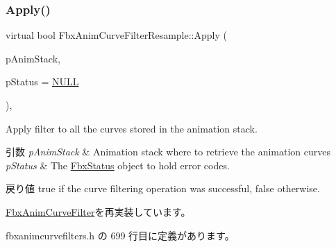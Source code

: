 \subsubsection{\texorpdfstring{Apply()}{Apply()}\hspace{0.1cm}{\footnotesize\ttfamily [1/5]}}
{\footnotesize\ttfamily virtual bool Fbx\+Anim\+Curve\+Filter\+Resample\+::\+Apply (\begin{DoxyParamCaption}\item[{\hyperlink{class_fbx_anim_stack}{Fbx\+Anim\+Stack} $\ast$}]{p\+Anim\+Stack,  }\item[{\hyperlink{class_fbx_status}{Fbx\+Status} $\ast$}]{p\+Status = {\ttfamily \hyperlink{fbxarch_8h_a070d2ce7b6bb7e5c05602aa8c308d0c4}{N\+U\+LL}} }\end{DoxyParamCaption})\hspace{0.3cm}{\ttfamily [inline]}, {\ttfamily [virtual]}}

Apply filter to all the curves stored in the animation stack. 
\begin{DoxyParams}{引数}
{\em p\+Anim\+Stack} & Animation stack where to retrieve the animation curves \\
\hline
{\em p\+Status} & The \hyperlink{class_fbx_status}{Fbx\+Status} object to hold error codes. \\
\hline
\end{DoxyParams}
\begin{DoxyReturn}{戻り値}
{\ttfamily true} if the curve filtering operation was successful, {\ttfamily false} otherwise. 
\end{DoxyReturn}


\hyperlink{class_fbx_anim_curve_filter_aef3900e6180e05661c27ee484ae939c3}{Fbx\+Anim\+Curve\+Filter}を再実装しています。



 fbxanimcurvefilters.\+h の 699 行目に定義があります。

\mbox{\label{class_fbx_anim_curve_filter_resample_a6f22a537869dc295ceff244f56ac561e}} 

